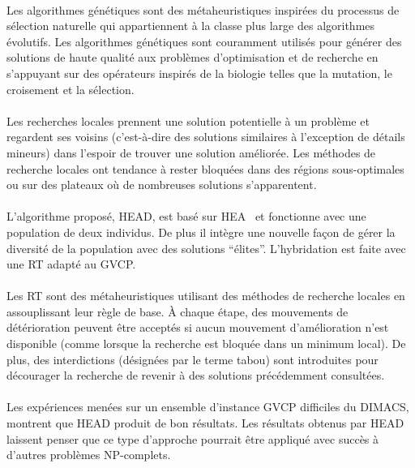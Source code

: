\documentclass[a4paper,11pt,twoside,french,report]{../common/simplem}
\begin{document}
				\paragraph*{}
					Les algorithmes génétiques sont des métaheuristiques inspirées du processus de sélection naturelle qui appartiennent à la classe plus large des algorithmes évolutifs. Les algorithmes génétiques sont couramment utilisés pour générer des solutions de haute qualité aux problèmes d'optimisation et de recherche en s'appuyant sur des opérateurs inspirés de la biologie telles que la mutation, le croisement et la sélection.
				\paragraph*{}
					Les recherches locales prennent une solution potentielle à un problème et regardent ses voisins (c'est-à-dire des solutions similaires à l'exception de détails mineurs) dans l'espoir de trouver une solution améliorée. Les méthodes de recherche locales ont tendance à rester bloquées dans des régions sous-optimales ou sur des plateaux où de nombreuses solutions s'apparentent.
				\paragraph*{}
					L'algorithme proposé, \gls{HEAD}, est basé sur \gls{HEA}~\cite{Galinier1999} et fonctionne avec une population de deux individus. De plus il intègre une nouvelle façon de gérer la diversité de la population avec des solutions ``élites''. L'hybridation est faite avec une \gls{RT} adapté au \gls{GVCP}.
				\paragraph*{}
					Les \gls{RT} sont des métaheuristiques utilisant des méthodes de recherche locales en assouplissant leur règle de base. À chaque étape, des mouvements de détérioration peuvent être acceptés si aucun mouvement d'amélioration n'est disponible (comme lorsque la recherche est bloquée dans un minimum local). De plus, des interdictions (désignées par le terme tabou) sont introduites pour décourager la recherche de revenir à des solutions précédemment consultées.
				\paragraph*{}
					Les expériences menées sur un ensemble d'instance \gls{GVCP} difficiles du \gls{DIMACS}, montrent que \gls{HEAD} produit de bon résultats. Les résultats obtenus par \gls{HEAD} laissent penser que ce type d'approche pourrait être appliqué avec succès à d'autres problèmes \acrshort{NP}-complets.
\end{document}
